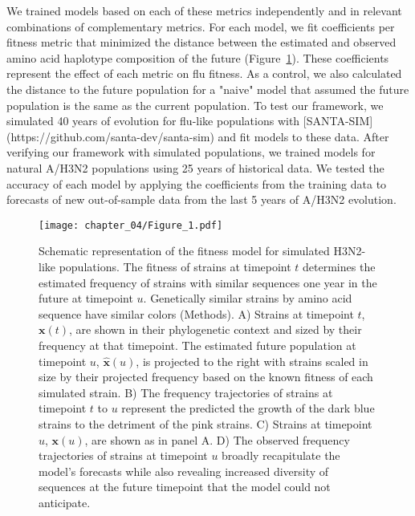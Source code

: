 We trained models based on each of these metrics independently and in relevant combinations of complementary metrics.
For each model, we fit coefficients per fitness metric that minimized the distance between the estimated and observed amino acid haplotype composition of the future (Figure~\ref{fig:model}).
These coefficients represent the effect of each metric on flu fitness.
As a control, we also calculated the distance to the future population for a "naive" model that assumed the future population is the same as the current population.
To test our framework, we simulated 40 years of evolution for flu-like populations with [SANTA-SIM](https://github.com/santa-dev/santa-sim) and fit models to these data.
After verifying our framework with simulated populations, we trained models for natural A/H3N2 populations using 25 years of historical data.
We tested the accuracy of each model by applying the coefficients from the training data to forecasts of new out-of-sample data from the last 5 years of A/H3N2 evolution.

\begin{figure}
  \begin{center}
  \texttt{[image: chapter\_04/Figure\_1.pdf]}
  \caption{
    Schematic representation of the fitness model for simulated H3N2-like populations.
    The fitness of strains at timepoint $t$ determines the estimated frequency of strains with similar sequences one year in the future at timepoint $u$.
    Genetically similar strains by amino acid sequence have similar colors (Methods).
    A) Strains at timepoint $t$, $\mathbf{x}(t)$, are shown in their phylogenetic context and sized by their frequency at that timepoint.
    The estimated future population at timepoint $u$, $\mathbf{\hat{x}}(u)$, is projected to the right with strains scaled in size by their projected frequency based on the known fitness of each simulated strain.
    B) The frequency trajectories of strains at timepoint $t$ to $u$ represent the predicted the growth of the dark blue strains to the detriment of the pink strains.
    C) Strains at timepoint $u$, $\mathbf{x}(u)$, are shown as in panel A.
    D) The observed frequency trajectories of strains at timepoint $u$ broadly recapitulate the model's forecasts while also revealing increased diversity of sequences at the future timepoint that the model could not anticipate.
  }
  \label{fig:model}
  \end{center}
\end{figure}


